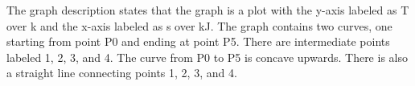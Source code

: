 The graph description states that the graph is a plot with the y-axis labeled as T over k and the x-axis labeled as s over kJ. The graph contains two curves, one starting from point P0 and ending at point P5. There are intermediate points labeled 1, 2, 3, and 4. The curve from P0 to P5 is concave upwards. There is also a straight line connecting points 1, 2, 3, and 4.